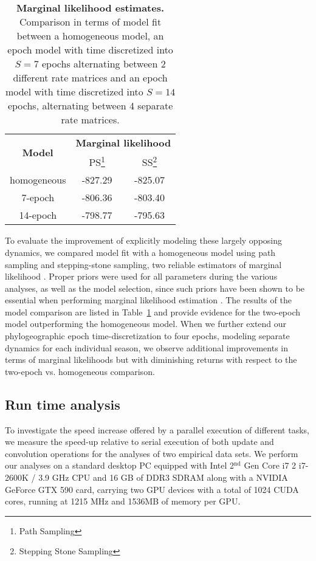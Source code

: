 \begin{table}[H]
\begin{minipage}{\textwidth} 
\centering
\begin{tabular}{ccc}
\hline 
\multirow{2}{*}{\textbf{Model}} & \multicolumn{2}{c}{\textbf{Marginal likelihood}}\tabularnewline
 & PS\footnote{Path Sampling} & SS\footnote{Stepping Stone Sampling}\tabularnewline
\hline 
homogeneous & -827.29 & -825.07\tabularnewline
7-epoch & -806.36  & -803.40 \tabularnewline
14-epoch & -798.77  & -795.63 \tabularnewline
\end{tabular}
\caption{
{ \footnotesize 
{\bf Marginal likelihood estimates.} Comparison in terms of model fit between a homogeneous model, an epoch model with time discretized into $S=7$ epochs alternating between 2 different rate matrices and an epoch model with time discretized into $S=14$ epochs, alternating between 4 separate rate matrices.
} %
}
\label{tab:flu_ps}
\end{minipage}
\end{table}

To evaluate the improvement of explicitly modeling these largely opposing dynamics, we compared model fit with a homogeneous model using path sampling and stepping-stone sampling, two reliable estimators of marginal likelihood \citep{Baele2012}. 
Proper priors were used for all parameters during the various analyses, as well as the model selection, since such priors have been shown to be essential when performing marginal likelihood estimation \citep{Baele2012}.
The results of the model comparison are listed in Table~\ref{tab:flu_ps} and provide evidence for the two-epoch model outperforming the homogeneous model.
When we further extend our phylogeographic epoch time-discretization to four epochs, modeling separate dynamics for each individual season, we observe additional improvements in terms of marginal likelihoods but with diminishing returns with respect to the two-epoch vs. homogeneous comparison. %

\subsection{Run time analysis}

To investigate the speed increase offered by a parallel execution of different tasks, we measure the speed-up relative to serial execution of both update and convolution operations for the analyses of two empirical data sets.
We perform our analyses on a standard desktop PC equipped with Intel 2$^{\text{nd}}$ Gen Core i7 2 i7-2600K / 3.9 GHz CPU and 16 GB of DDR3 SDRAM along with a NVIDIA GeForce GTX 590 card, carrying two GPU devices with a total of 1024 CUDA cores, running at 1215 MHz and 1536MB of memory per GPU. 

